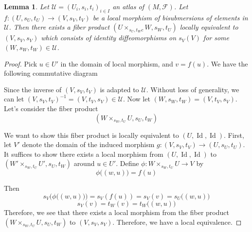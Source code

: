 \documentclass[12pt]{amsart}
\newtheorem{lem}[thm]{Lemma}
\theoremstyle{definition}
\theoremstyle{remark}
\numberwithin{equation}{section}
\newcommand{\CF}{{\mathcal F}}
\newcommand{\1}{{\mathbb{1}}}
\newcommand{\id}{\operatorname{Id}}
\begin{document}
\begin{lem}\label{equi}
    Let $\mathcal{U}= (U_i, s_i, t_i)_{i\in I}$ an atlas of $(M, \CF)$.  Let $f: (U, s_U, t_U) \to (V, s_V, t_V)$ be a local morphism of bisubmersions of elements in $\mathcal{U}$.
Then there exists a fiber product $(U\times_{s_U, t_Wc} W, s_W, t_U)$ locally equivalent to $(V, s_V, s_V)$ which consists of identity diffeomorphisms on $s_V(V)$ for some  $(W, s_W, t_W)\in \mathcal{U}$.
\end{lem}
\begin{proof}
    Pick $u\in U'$ in the domain of local morphism, and $v = f(u)$. We have the following commutative diagram
    \begin{center}
    \end{center}
    Since the inverse of $(V, s_V, t_V)$ is adapted to $\mathcal{U}$. Without loss of generality, we can let  $(V, s_V, t_V)^{-1} = (V, t_V, s_V)\in \mathcal{U}$.
    Now let $(W, s_W, t_W) = (V, t_V, s_V)$. Let's consider the fiber product
    \begin{equation*}
        (W\times_{{s_W, t_U}} U, s_U, t_W)
    \end{equation*}
    
    
    We want to show this fiber product is locally equivalent to $(U, \id, \id)$. First, let $V'$ denote the domain of the induced morphism  $g: (V, s_V, t_V)\to (U, s_U, t_U)$. It suffices to show there exists a local morphism from $(U,\id, \id)$ to $(W'\times_{{s_W, t_U}} U',s_U, t_W)$  around $u\in U'$. Define $\phi:  W\times_{{s_W, t_U}}U \to V $ by
    \begin{equation*}
        \phi\big((w,u)\big) = f(u)
    \end{equation*}
    
    Then 
    \begin{equation*}
        s_V\Big(\phi\big((w,u)\big)\Big)  = s_V(f(u)) = s_V(v) = s_U\big((w,u) \big)
    \end{equation*}
    \begin{equation*}
         s_V(v)=t_W(v) = t_W\big((w,u) \big)
    \end{equation*}
    Therefore, we see that there exists a local morphism from the fiber product $(W\times_{{s_W, t_U}} U, s_U, t_W)$ to $(V, s_V, s_V)$. Therefore, we have a local equivalence.
     

\end{proof}
\end{document}
